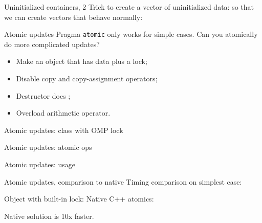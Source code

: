 \documentclass[11pt,headernav]{beamer}
\begin{document}
\begin{numberedframe}{Uninitialized containers, 2}
  Trick to create a vector of uninitialized data:
  so that we can create vectors that behave normally:
\end{numberedframe}

\begin{numberedframe}{Atomic updates}
  Pragma \lstinline{atomic} only works for simple cases.
  Can you atomically do more complicated updates?
  \begin{itemize}
  \item Make an object that has data plus a lock;
  \item Disable copy and copy-assignment operators;
  \item Destructor does ;
  \item Overload arithmetic operator.
  \end{itemize}
\end{numberedframe}

\begin{numberedframe}{Atomic updates: class with OMP lock}
\end{numberedframe}

\begin{numberedframe}{Atomic updates: atomic ops}
\end{numberedframe}

\begin{numberedframe}{Atomic updates: usage}
\end{numberedframe}

\begin{numberedframe}{Atomic updates, comparison to native}
  Timing comparison on simplest case:
\begin{multicols}{2}
  \lstset{basicstyle=\scriptsize}
  Object with built-in lock:
\columnbreak
Native C++ atomics:
\end{multicols}

  Native solution is 10x faster.

\end{numberedframe}
\end{document}
